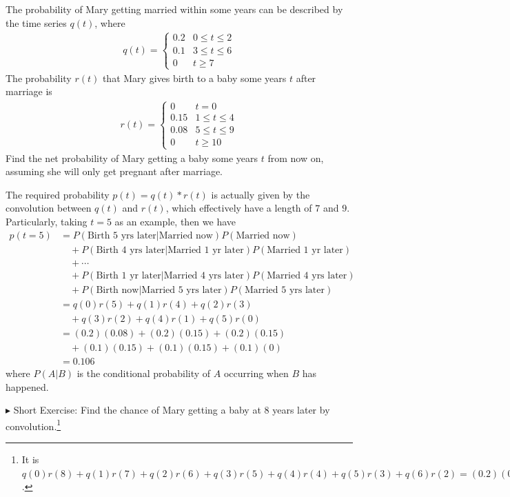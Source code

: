 \begin{exmp}
The probability of Mary getting married within some years can be described by the time series $q(t)$, where
\begin{align*}
q(t) = 
\begin{cases}
0.2 & 0 \leq t \leq 2 \\
0.1 & 3 \leq t \leq 6 \\
0 & t \geq 7
\end{cases}
\end{align*}
The probability $r(t)$ that Mary gives birth to a baby some years $t$ after marriage is
\begin{align*}
r(t) = 
\begin{cases}
0 & t = 0 \\
0.15 & 1 \leq t \leq 4 \\
0.08 & 5 \leq t \leq 9 \\
0 & t \geq 10
\end{cases}    
\end{align*}
Find the net probability of Mary getting a baby some years $t$ from now on, assuming she will only get pregnant after marriage. 
\end{exmp}
\begin{solution}
The required probability $p(t) = q(t) * r(t)$ is actually given by the convolution between $q(t)$ and $r(t)$, which effectively have a length of $7$ and $9$. Particularly, taking $t = 5$ as an example, then we have
\begin{align*}
p(t = 5) &= P(\text{Birth 5 yrs later}|\text{Married now})P(\text{Married now}) \\
&\quad+ P(\text{Birth 4 yrs later}|\text{Married 1 yr later})P(\text{Married 1 yr later})\\
&\quad+ \cdots \\
&\quad+ P(\text{Birth 1 yr later}|\text{Married 4 yrs later})P(\text{Married 4 yrs later}) \\
&\quad+ P(\text{Birth now}|\text{Married 5 yrs later})P(\text{Married 5 yrs later}) \\
&= q(0)r(5) + q(1)r(4) + q(2)r(3) \\
&\quad + q(3)r(2) + q(4)r(1) + q(5)r(0) \\
&= (0.2)(0.08) + (0.2)(0.15) + (0.2)(0.15) \\
&\quad + (0.1)(0.15) + (0.1)(0.15) + (0.1)(0) \\
&= 0.106
\end{align*}
where $P(A|B)$ is the conditional probability of $A$ occurring when $B$ has happened.
\end{solution}
$\blacktriangleright$ Short Exercise: Find the chance of Mary getting a baby at $8$ years later by convolution.\footnote{It is $q(0)r(8) + q(1)r(7) + q(2)r(6) + q(3)r(5) + q(4)r(4) + q(5)r(3) + q(6)r(2) = (0.2)(0.08) + (0.2)(0.08) + (0.2)(0.08) + (0.1)(0.08) + (0.1)(0.15) + (0.1)(0.15) + (0.1)(0.15) = 0.101$.}\par

